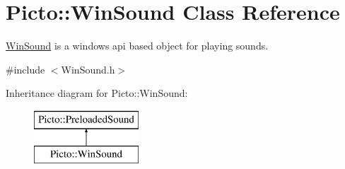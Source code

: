 \hypertarget{class_picto_1_1_win_sound}{\section{Picto\-:\-:Win\-Sound Class Reference}
\label{class_picto_1_1_win_sound}
}


\hyperlink{class_picto_1_1_win_sound}{Win\-Sound} is a windows api based object for playing sounds.  




{\ttfamily \#include $<$Win\-Sound.\-h$>$}

Inheritance diagram for Picto\-:\-:Win\-Sound\-:\begin{figure}[H]
\begin{center}
\leavevmode
\includegraphics[height=2.000000cm]{class_picto_1_1_win_sound}
\end{center}
\end{figure}
